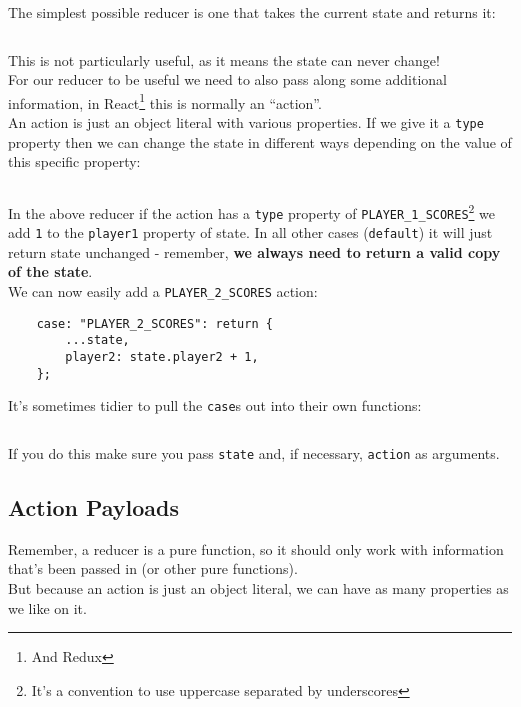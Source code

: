 The simplest possible reducer is one that takes the current state and returns it:

\inputminted{js}{05-hooks/figures/04-reducer-id.js}

This is not particularly useful, as it means the state can never change!
\\

For our reducer to be useful we need to also pass along some additional information, in React\footnote{And Redux} this is normally an ``action''.
\\

An action is just an object literal with various properties. If we give it a \texttt{type} property then we can change the state in different ways depending on the value of this specific property:

\inputminted{js}{05-hooks/figures/05-reducer-p1scores.js}

In the above reducer if the action has a \texttt{type} property of \texttt{PLAYER\_1\_SCORES}\footnote{It's a convention to use uppercase separated by underscores} we add \texttt{1} to the \texttt{player1} property of state. In all other cases (\texttt{default}) it will just return state unchanged - remember, \textbf{we always need to return a valid copy of the state}.
\\

We can now easily add a \texttt{PLAYER\_2\_SCORES} action:

\begin{verbatim}
    case: "PLAYER_2_SCORES": return {
        ...state,
        player2: state.player2 + 1,
    };
\end{verbatim}

It's sometimes tidier to pull the \texttt{case}s out into their own functions:

\inputminted{js}{05-hooks/figures/06-reducer-pull.js}

If you do this make sure you pass \texttt{state} and, if necessary, \texttt{action} as arguments.


\subsection{Action Payloads}

Remember, a reducer is a pure function, so it should only work with information that's been passed in (or other pure functions).
\\

But because an action is just an object literal, we can have as many properties as we like on it.
\\

